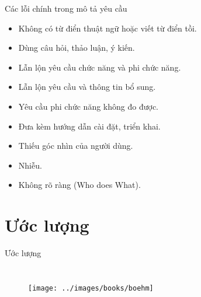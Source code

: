 \documentclass{beamer}
\begin{document}
\begin{frame}{Các lỗi chính trong mô tả yêu cầu}
    \begin{block}{}
        \begin{itemize}
            \item Không có từ điển thuật ngữ hoặc viết từ điển tồi.
            \item Dùng câu hỏi, thảo luận, ý kiến.
            \item Lẫn lộn yêu cầu chức năng và phi chức năng.
            \item Lẫn lộn yêu cầu và thông tin bổ sung.
            \item Yêu cầu phi chức năng không đo được.
            \item Đưa kèm hướng dẫn cài đặt, triển khai.
            \item Thiếu góc nhìn của người dùng.
            \item Nhiễu.
            \item Không rõ ràng (Who does What).
        \end{itemize}
    \end{block}
\end{frame}

\section{Ước lượng}

\begin{frame}{Ước lượng}
    \begin{columns}
        \begin{figure}
            \centering
            \texttt{[image: ../images/books/boehm]}
        \end{figure}
    \end{columns}
\end{frame}
\end{document}
